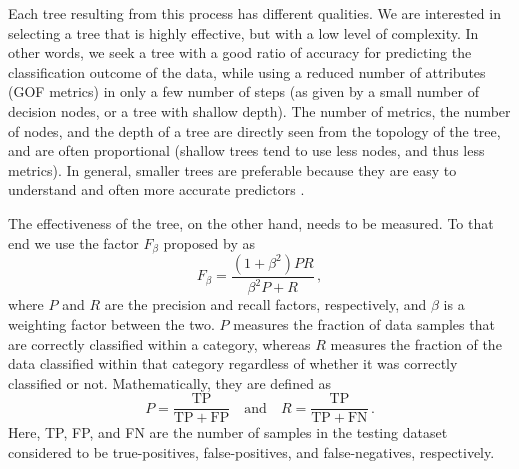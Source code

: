 Each tree resulting from this process has different qualities. We are interested in selecting a tree that is highly effective, but with a low level of complexity. In other words, we seek a tree with a good ratio of accuracy for predicting the classification outcome of the data, while using a reduced number of attributes (GOF metrics) in only a few number of steps (as given by a small number of decision nodes, or a tree with shallow depth). The number of metrics, the number of nodes, and the depth of a tree are directly seen from the topology of the tree, and are often proportional (shallow trees tend to use less nodes, and thus less metrics). In general, smaller trees are preferable because they are easy to understand and often more accurate predictors \citep{Quinlan_1996_JAIR}.

The effectiveness of the tree, on the other hand, needs to be measured. To that end we use the factor $F_{\beta}$ proposed by \citet{Rijsbergen_1979_Book} as
%
\begin{equation}
	\label{eq:f}
	F_{\beta} = \frac{ (1 + \beta^2) P R}{\beta^2 P + R}
	\, ,
\end{equation}
%
where $P$ and $R$ are the precision and recall factors, respectively, and $\beta$ is a weighting factor between the two. $P$ measures the fraction of data samples that are correctly classified within a category, whereas $R$ measures the fraction of the data classified within that category regardless of whether it was correctly classified or not. Mathematically, they are defined as
%
\begin{equation}
	P = \frac{ \mathrm{TP} }{ \mathrm{TP} + \mathrm{FP} }
	\quad \mathrm{and} \quad
	R = \frac{ \mathrm{TP} }{ \mathrm{TP} + \mathrm{FN} }
	\, .
\end{equation}
%
Here, TP, FP, and FN are the number of samples in the testing dataset considered to be true-positives, false-positives, and false-negatives, respectively. 

